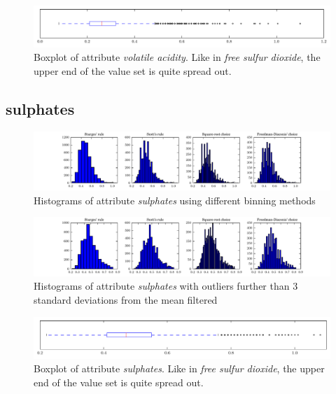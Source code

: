 \documentclass{report}
\begin{document}
\begin{figure}[H]
\includegraphics[width=\textwidth]{boxplots/volatile_acidity.pdf}
\caption{Boxplot of attribute \emph{volatile acidity}. Like in \emph{free sulfur dioxide}, the upper end of the value set is quite spread out.}\end{figure}

\newpage
\subsection{sulphates}
\begin{figure}[H]
\includegraphics[width=\textwidth]{histograms/sulphates.pdf}
\caption{Histograms of attribute \emph{sulphates} using different binning methods}\end{figure}

\begin{figure}[H]
\includegraphics[width=\textwidth]{histograms/sulphates_filtered.pdf}
\caption{Histograms of attribute \emph{sulphates} with outliers further than 3 standard deviations from the mean filtered}
\end{figure}

\begin{figure}[H]
\includegraphics[width=\textwidth]{boxplots/sulphates.pdf}
\caption{Boxplot of attribute \emph{sulphates}. Like in \emph{free sulfur dioxide}, the upper end of the value set is quite spread out.}\end{figure}
\end{document}
